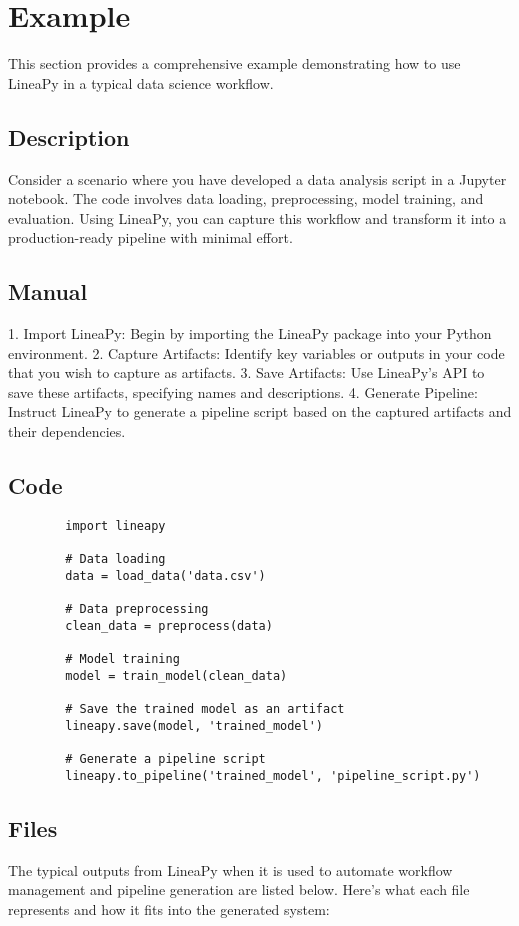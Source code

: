 	\section{Example}
		This section provides a comprehensive example demonstrating how to use LineaPy in a typical data science workflow.
	
	\subsection{Description}
	Consider a scenario where you have developed a data analysis script in a Jupyter notebook. The code involves data loading, preprocessing, model training, and evaluation. Using LineaPy, you can capture this workflow and transform it into a production-ready pipeline with minimal effort.
	\subsection{Manual}
		1. Import LineaPy: Begin by importing the LineaPy package into your Python environment.
	2. Capture Artifacts: Identify key variables or outputs in your code that you wish to capture as artifacts.
	3. Save Artifacts: Use LineaPy's API to save these artifacts, specifying names and descriptions.
	4. Generate Pipeline: Instruct LineaPy to generate a pipeline script based on the captured artifacts and their dependencies.
	\subsection{Code}
	
	
	
	\begin{lstlisting}
		import lineapy
		
		# Data loading
		data = load_data('data.csv')
		
		# Data preprocessing
		clean_data = preprocess(data)
		
		# Model training
		model = train_model(clean_data)
		
		# Save the trained model as an artifact
		lineapy.save(model, 'trained_model')
		
		# Generate a pipeline script
		lineapy.to_pipeline('trained_model', 'pipeline_script.py')
	\end{lstlisting}
	\subsection{Files}
The typical outputs from LineaPy when it is used to automate workflow management and pipeline generation are listed below. Here's what each file represents and how it fits into the generated system:

